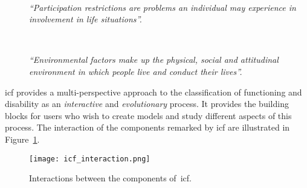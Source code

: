 \begin{description}
  \item[] \hfill \\
    \begin{mdframed}[hidealllines=true,backgroundcolor=gray!20]
    \textit{``Participation restrictions are problems an individual may experience 
    in involvement in life situations''.}
    \end{mdframed}

  \item[] \hfill \\
    \begin{mdframed}[hidealllines=true,backgroundcolor=gray!20]
    \textit{``Environmental factors make up the physical, social and attitudinal
    environment in which people live and conduct their lives''.}
    \end{mdframed} 
\end{description}

\ac{icf} provides a multi-perspective approach to the classification of functioning 
and disability as an \textit{interactive} and \textit{evolutionary} process. It 
provides the building blocks for users who wish to create models and study 
different aspects of this process. The interaction of the components remarked by
\ac{icf} are illustrated in Figure~\ref{fig:icf_interaction}.

\begin{figure}
\centering
\texttt{[image: icf\_interaction.png]}
\caption{Interactions between the components of~\ac{icf}.}
\label{fig:icf_interaction}
\end{figure}